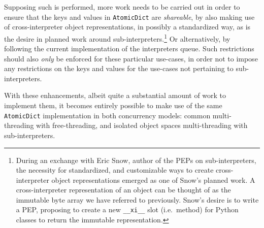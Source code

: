 Supposing such is performed, more work needs to be carried out in order to ensure that the keys and values in \texttt{AtomicDict} are \emph{shareable}, by also making use of cross-interpreter object representations, in possibly a standardized way, as is the desire in planned work around sub-interpreters.\footnote{%
    During an exchange with Eric Snow, author of the PEPs on sub-interpreters, the necessity for standardized, and customizable ways to create cross-interpreter object representations emerged as one of Snow's planned work.
    A cross-interpreter representation of an object can be thought of as the immutable byte array we have referred to previously.
    Snow's desire is to write a PEP, proposing to create a new \texttt{\_\_xi\_\_} slot (i.e.\ method) for Python classes to return the immutable representation.
}
Or alternatively, by following the current implementation of the interpreters queue.
Such restrictions should also \emph{only} be enforced for these particular use-cases, in order not to impose any restrictions on the keys and values for the use-cases not pertaining to sub-interpreters.

With these enhancements, albeit quite a substantial amount of work to implement them, it becomes entirely possible to make use of the same \texttt{AtomicDict} implementation in both concurrency models: common multi-threading with free-threading, and isolated object spaces multi-threading with sub-interpreters.
